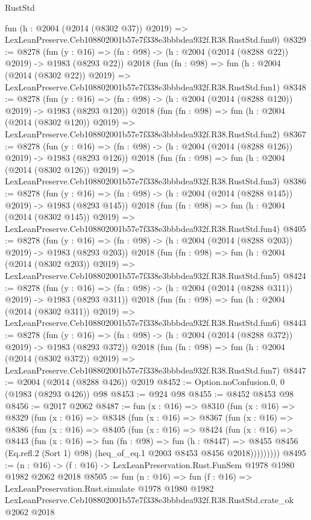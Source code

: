\begin{lexlean}{RustStd}
\begin{coremodule}
    fun (h : @2004 (@2014 (@8302 @37)) @2019) =>
    LexLeanPreserve.Ceb108802001b57e7f338e3bbbdea932f.R38.RustStd.fun0)
@8329 := @8278
    (fun (y : @16) => (fn : @98) -> (h : @2004 (@2014 (@8288 @22)) @2019) -> @1983 (@8293 @22))
    @2018
    (fun (fn : @98) =>
    fun (h : @2004 (@2014 (@8302 @22)) @2019) =>
    LexLeanPreserve.Ceb108802001b57e7f338e3bbbdea932f.R38.RustStd.fun1)
@8348 := @8278
    (fun (y : @16) => (fn : @98) -> (h : @2004 (@2014 (@8288 @120)) @2019) -> @1983 (@8293 @120))
    @2018
    (fun (fn : @98) =>
    fun (h : @2004 (@2014 (@8302 @120)) @2019) =>
    LexLeanPreserve.Ceb108802001b57e7f338e3bbbdea932f.R38.RustStd.fun2)
@8367 := @8278
    (fun (y : @16) => (fn : @98) -> (h : @2004 (@2014 (@8288 @126)) @2019) -> @1983 (@8293 @126))
    @2018
    (fun (fn : @98) =>
    fun (h : @2004 (@2014 (@8302 @126)) @2019) =>
    LexLeanPreserve.Ceb108802001b57e7f338e3bbbdea932f.R38.RustStd.fun3)
@8386 := @8278
    (fun (y : @16) => (fn : @98) -> (h : @2004 (@2014 (@8288 @145)) @2019) -> @1983 (@8293 @145))
    @2018
    (fun (fn : @98) =>
    fun (h : @2004 (@2014 (@8302 @145)) @2019) =>
    LexLeanPreserve.Ceb108802001b57e7f338e3bbbdea932f.R38.RustStd.fun4)
@8405 := @8278
    (fun (y : @16) => (fn : @98) -> (h : @2004 (@2014 (@8288 @203)) @2019) -> @1983 (@8293 @203))
    @2018
    (fun (fn : @98) =>
    fun (h : @2004 (@2014 (@8302 @203)) @2019) =>
    LexLeanPreserve.Ceb108802001b57e7f338e3bbbdea932f.R38.RustStd.fun5)
@8424 := @8278
    (fun (y : @16) => (fn : @98) -> (h : @2004 (@2014 (@8288 @311)) @2019) -> @1983 (@8293 @311))
    @2018
    (fun (fn : @98) =>
    fun (h : @2004 (@2014 (@8302 @311)) @2019) =>
    LexLeanPreserve.Ceb108802001b57e7f338e3bbbdea932f.R38.RustStd.fun6)
@8443 := @8278
    (fun (y : @16) => (fn : @98) -> (h : @2004 (@2014 (@8288 @372)) @2019) -> @1983 (@8293 @372))
    @2018
    (fun (fn : @98) =>
    fun (h : @2004 (@2014 (@8302 @372)) @2019) =>
    LexLeanPreserve.Ceb108802001b57e7f338e3bbbdea932f.R38.RustStd.fun7)
@8447 := @2004 (@2014 (@8288 @426)) @2019
@8452 := Option.noConfusion.{0, 0} (@1983 (@8293 @426)) @98
@8453 := @924 @98
@8455 := @8452 @8453 @98
@8456 := @2017 @2062
@8487 := fun (x : @16) =>
  @8310
    (fun (x : @16) =>
    @8329
      (fun (x : @16) =>
      @8348
        (fun (x : @16) =>
        @8367
          (fun (x : @16) =>
          @8386
            (fun (x : @16) =>
            @8405
              (fun (x : @16) =>
              @8424
                (fun (x : @16) =>
                @8443
                  (fun (x : @16) =>
                  fun (fn : @98) =>
                  fun (h : @8447) =>
                  @8455
                    @8456
                    (Eq.refl.{2} (Sort 1) @98)
                    (heq_of_eq.{1} @2003 @8453 @8456 @2018)))))))))
@8495 := (n : @16) -> (f : @16) -> LexLeanPreservation.Rust.FunSem @1978 @1980 @1982 @2062 @2018
@8505 := fun (n : @16) =>
  fun (f : @16) =>
  LexLeanPreservation.Rust.simulate
    @1978
    @1980
    @1982
    LexLeanPreserve.Ceb108802001b57e7f338e3bbbdea932f.R38.RustStd.crate_ok
    @2062
    @2018
\end{coremodule}
\end{lexlean}
